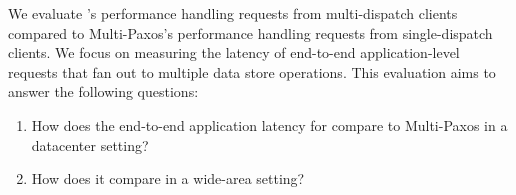 We evaluate \sys{}'s performance handling requests from multi-dispatch clients
compared to Multi-Paxos's performance handling requests from single-dispatch
clients.  We focus on measuring the latency of end-to-end
application-level requests that fan out to multiple data store operations.
This evaluation aims to answer the following questions:
\begin{enumerate}[leftmargin=*]
    \item How does the end-to-end application latency for \sys{} compare to Multi-Paxos in a datacenter setting?
    \item How does it compare in a wide-area setting?
\end{enumerate}


